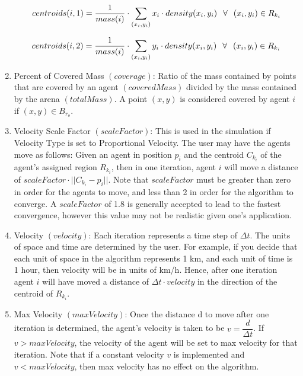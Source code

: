 \documentclass[../CourseManual.tex]{subfiles}
\begin{document}
\begin{enumerate}
  $$centroids(i,1) = \dfrac{1}{mass(i)}\cdot \sum_{(x_i,y_i)}x_i \cdot density(x_i,y_i) \hspace{0.25cm} \forall \hspace{0.25cm} (x_i,y_i) \in R_{k_{i}}$$
  
  $$centroids(i,2) = \dfrac{1}{mass(i)}\cdot \sum_{(x_i,y_i)}y_i \cdot density(x_i,y_i) \hspace{0.25cm} \forall \hspace{0.25cm} (x_i,y_i) \in R_{k_{i}}$$
  
  \item Percent of Covered Mass $(coverage)$: Ratio of the mass contained by points that are covered by an agent $(coveredMass)$ divided by the mass contained by the arena $(totalMass)$. A point $(x,y)$ is considered covered by agent $i$ if $(x,y) \in B_{r_{o}}$. 
  
  \item Velocity Scale Factor $(scaleFactor)$: This is used in the simulation if Velocity Type is set to Proportional Velocity. The user may have the agents move as follows: Given an agent in position $p_i$ and the centroid $C_{k_{i}}$ of the agent’s assigned region $R_{k_{i}}$, then in one iteration, agent $i$ will move a distance of $scaleFactor \cdot ||C_{k_{i}} - p_i||$. Note that $scaleFactor$ must be greater than zero in order for the agents to move, and less than 2 in order for the algorithm to converge. A $scaleFactor$ of 1.8 is generally accepted to lead to the fastest convergence, however this value may not be realistic given one’s application.
  
  \item Velocity $(velocity)$: Each iteration represents a time step of $\Delta t$. The units of space and time are determined by the user. For example, if you decide that each unit of space in the algorithm represents 1 km, and each unit of time is 1 hour, then velocity will be in units of km/h. Hence, after one iteration agent $i$ will have moved a distance of $\Delta t \cdot velocity$ in the direction of the centroid of $R_{k_{i}}$.
  
  \item Max Velocity $(maxVelocity)$: Once the distance d to move after one iteration is determined, the agent’s velocity is taken to be $v = \dfrac{d}{\Delta t}$. If $v > maxVelocity$, the velocity of the agent will be set to max velocity for that iteration. Note that if a constant velocity $v$ is implemented and $v < maxVelocity$, then max velocity has no effect on the algorithm.
  

\end{enumerate}
\end{document}
